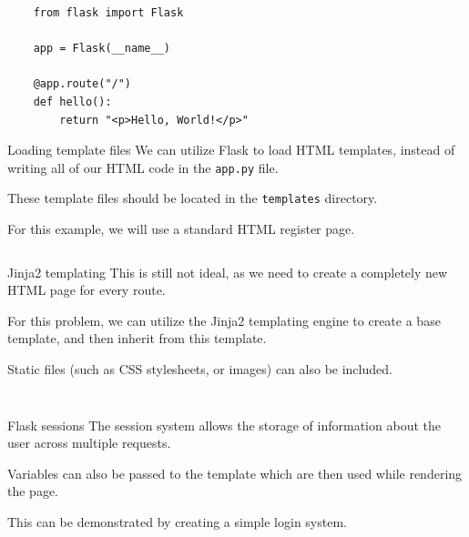 \documentclass{beamer}
\begin{document}
	\begin{frame}[fragile]
		\begin{verbatim}
	from flask import Flask

	app = Flask(__name__)

	@app.route("/")
	def hello():
		return "<p>Hello, World!</p>"
		\end{verbatim}
	\end{frame}

	\begin{frame}{Loading template files}
		We can utilize Flask to load HTML templates, instead of writing all of our HTML code in the \texttt{app.py} file. \par
		
		These template files should be located in the \texttt{templates} directory. \par

		For this example, we will use a standard HTML register page.
	\end{frame}


	\begin{frame}[fragile]
		\small
		\inputminted{python}{examples/2/app.py}
	\end{frame}

	\begin{frame}{Jinja2 templating}
		This is still not ideal, as we need to create a completely new HTML page for every route. \par

		For this problem, we can utilize the Jinja2 templating engine to create a base template, and then inherit from this template.

		Static files (such as CSS stylesheets, or images) can also be included. \par
	\end{frame}

	\begin{frame}[fragile]
		\tiny
		\inputminted{html}{examples/3/templates/base.html}
	\end{frame}

	\begin{frame}[fragile]
		\small
		\inputminted{html}{examples/3/templates/register.html}
	\end{frame}

	\begin{frame}{Flask sessions}
		The session system allows the storage of information about the user across multiple requests. \par

		Variables can also be passed to the template which are then used while rendering the page. \par

		This can be demonstrated by creating a simple login system.
	\end{frame}
\end{document}
